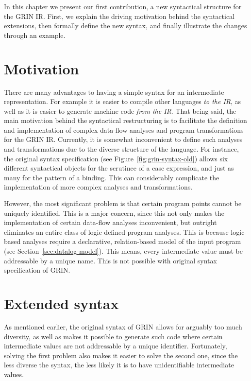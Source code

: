 \documentclass[main.tex]{subfiles}
\begin{document}
  In this chapter we present our first contribution, a new syntactical structure for the GRIN IR. First, we explain the driving motivation behind the syntactical extensions, then formally define the new syntax, and finally illustrate the changes through an example.

  \section{Motivation}

  There are many advantages to having a simple syntax for an intermediate representation. For example it is easier to compile other languages \emph{to the IR}, as well as it is easier to generate machine code \emph{from the IR}.
  That being said, the main motivation behind the syntactical restructuring is to facilitate the definition and implementation of complex data-flow analyses and program transformations for the GRIN IR. Currently, it is somewhat inconvenient to define such analyses and transformations due to the diverse structure of the language. For instance, the original syntax specification (see Figure~\ref{fig:grin-syntax-old}) allows six different syntactical objects for the scrutinee of a case expression, and just as many for the pattern of a binding. This can considerably complicate the implementation of more complex analyses and transformations.

  However, the most significant problem is that certain program points cannot be uniquely identified. This is a major concern, since this not only makes the implementation of certain data-flow analyses inconvenient, but outright eliminates an entire class of logic defined program analyses. This is because logic-based analyses require a declarative, relation-based model of the input program (see Section~\ref{sec:datalog-model}). This means, every intermediate value must be addressable by a unique name. This is not possible with original syntax specification of GRIN.

  \section{Extended syntax}

  As mentioned earlier, the original syntax of GRIN allows for arguably too much diversity, as well as makes it possible to generate such code where certain intermediate values are not addressable by a unique identifier. Fortunately, solving the first problem also makes it easier to solve the second one, since the less diverse the syntax, the less likely it is to have unidentifiable intermediate values.
\end{document}
